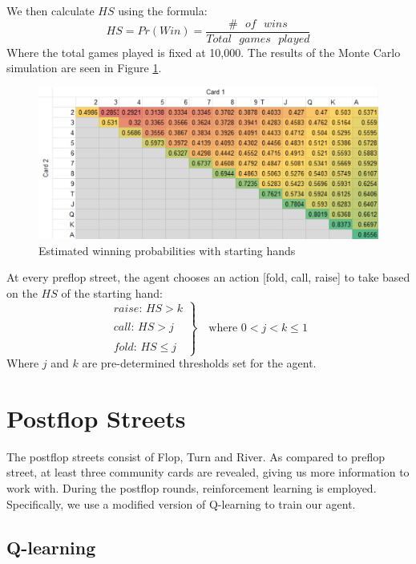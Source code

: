 \documentclass{article}
\begin{document}
We then calculate $HS$ using the formula:
\begin{displaymath}
 HS = Pr(Win)= \frac{\# \text{ } of \text{ } wins}{Total \text{ }games \text{ } played}
\end{displaymath}
Where the total games played is fixed at 10,000. The results of the Monte Carlo simulation are seen in Figure \ref{fig:1}.
\begin{figure}
  \includegraphics[width=\linewidth]{WinningProb.PNG}
  \caption{Estimated winning probabilities with starting hands}
  \label{fig:1}
\end{figure}

At every preflop street, the agent chooses an action [fold, call, raise] to take based on the $HS$ of the starting hand:
\begin{displaymath}
  \left.
  \begin{array}{l}
    raise \text{: } HS > k \\
    \\
    call \text{: } HS > j \\
    \\
    fold \text{: } HS \leq j
  \end{array}
  \right\rbrace \quad \text{where } 0 < j < k \leq 1
\end{displaymath}
Where $j$ and $k$ are pre-determined thresholds set for the agent.

\section{Postflop Streets}
The postflop streets consist of Flop, Turn and River. As compared to preflop street, at least three community cards are revealed, giving us more information to work with. During the postflop rounds, reinforcement learning is employed. Specifically, we use a modified version of Q-learning to train our agent.

\subsection{Q-learning}
\end{document}
